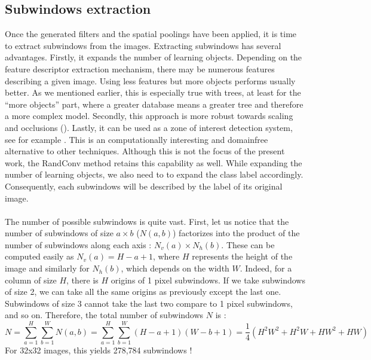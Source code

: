 \documentclass[a4paper]{report}
\begin{document}
		\subsection{Subwindows extraction}
		Once the generated filters and the spatial poolings have been applied, it is time to extract subwindows from the images. Extracting subwindows has several advantages. 
		Firstly, it expands the number of learning objects. Depending on the feature descriptor extraction mechanism, there may be numerous features describing a given image. Using less features but more objects performs usually better. As we mentioned earlier, this is especially true with trees, at least for the ``more objects'' part, where a greater database means a greater tree and therefore a more complex model.
		Secondly, this approach is more robust towards scaling and occlusions (\cite{pxitrecap}).
		Lastly, it can be used as a zone of interest detection system, see for example \cite{mareebiological}. This is an computationally interesting and domainfree alternative to other techniques. Although this is not the focus of the present work, the RandConv method retains this capability as well.
		While expanding the number of learning objects, we also need to to expand the class label accordingly. Consequently, each subwindows will be described by the label of its original image.
		
		\paragraph{}
		The number of possible subwindows is quite vast. %
		First, let us notice that the number of subwindows of size $a \times b$ ($N(a,b)$) factorizes into the product of the number of subwindows along each axis : $N_v(a) \times N_h(b)$. These can be computed easily as $N_v(a) = H - a + 1$, where $H$ represents the height of the image and similarly for $N_h(b)$, which depends on the width $W$. Indeed, for a column of size $H$, there is $H$ origins of 1 pixel subwindows. If we take subwindows of size 2, we can take all the same origins as previously except the last one. Subwindows of size 3 cannot take the last two compare to 1 pixel subwindows, and so on.
		Therefore, the total number of subwindows $N$ is :
		\[
			N = \sum_{a=1}^H \sum_{b=1}^W N(a,b) = \sum_{a=1}^H \sum_{b=1}^W (H-a+1)(W-b+1) = \frac{1}{4}(H^2W^2 + H^2 W + H W^2 + HW)
		\]
		For 32x32 images, this yields 278,784 subwindows !
		
\end{document}
